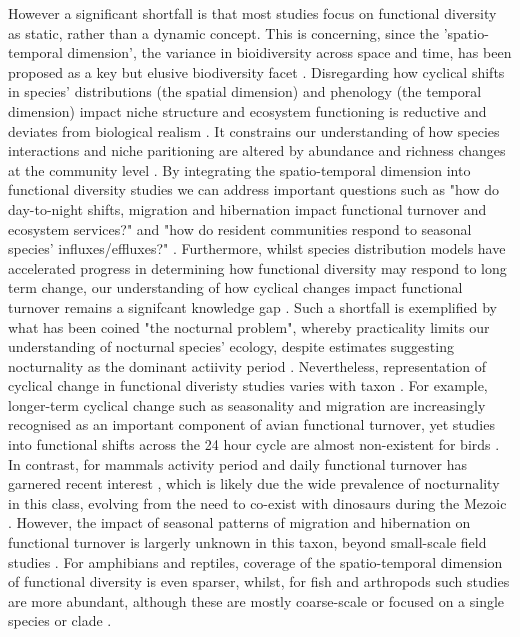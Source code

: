 \documentclass[11pt]{report}
\begin{document}
However a significant shortfall is that most studies focus on functional diversity as static, rather than a dynamic concept.
This is concerning, since the 'spatio-temporal dimension', the variance in bioidiversity across space and time, has been proposed as a key but elusive biodiversity facet \citep{Domisch2025}.
Disregarding how cyclical shifts in species' distributions (the spatial dimension) and phenology (the temporal dimension) impact niche structure and ecosystem functioning is reductive and deviates from biological realism \citep{Domisch2025}.
It constrains our understanding of how species interactions and niche paritioning are altered by abundance and richness changes at the community level \citep{Bauer2014}.
By integrating the spatio-temporal dimension into functional diversity studies we can address important questions such as "how do day-to-night shifts, migration and hibernation impact functional turnover and ecosystem services?" and "how do resident communities respond to seasonal species' influxes/effluxes?" \citep{Bauer2014,Gaston2019}.
Furthermore, whilst species distribution models have accelerated progress in determining how functional diversity may respond to long term change, our understanding of how cyclical changes impact functional turnover remains a signifcant knowledge gap \citep{Gaston2019}. 
Such a shortfall is exemplified by what has been coined "the nocturnal problem", whereby practicality limits our understanding of nocturnal species' ecology, despite estimates suggesting nocturnality as the dominant actiivity period \citep{HOLKER2010681, Gaston2019}. 
Nevertheless, representation of cyclical change in functional diveristy studies varies with taxon \citep{Bauer2014, Gaston2019, Domisch2025}. 
For example, longer-term cyclical change such as seasonality and migration are increasingly recognised as an important component of avian functional turnover, yet studies into functional shifts across the 24 hour cycle are almost non-existent for birds \citep{JARZYNA20231153}.
In contrast, for mammals activity period and daily functional turnover has garnered recent interest \citep{Mccain2014, doi:10.1126/sciadv.abn6008, Devarajan2025}, which is likely due the wide prevalence of nocturnality in this class, evolving from the need to co-exist with dinosaurs during the Mezoic \citep{Maor2017}.
However, the impact of seasonal patterns of migration and hibernation on functional turnover is largerly unknown in this taxon, beyond small-scale field studies \citep{https://doi.org/10.1111/fwb.12474, 10.1093/jmammal/gyy183}.
For amphibians and reptiles, coverage of the spatio-temporal dimension of functional diversity is even sparser, whilst, for fish and arthropods such studies are more abundant, although these are mostly coarse-scale or focused on a single species or clade \citep[e.g.,][]{Houadria2016, Santana2016, ZAMORALOPEZ2026119617, Li2025} .
\end{document}
